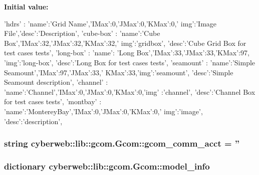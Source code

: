 {\bfseries \-Initial value\-:}
\begin{DoxyCode}
{
          'hdrs'         : {  'name':'Grid Name','IMax':0,'JMax':0,'KMax':0,'
      img':'Image File','desc':'Description'},
          'cube-box'     : {  'name':'Cube Box','IMax':32,'JMax':32,'KMax':32,'
      img':'gridbox',
                              'desc':'Cube Grid Box for test cases tests'},
          'long-box'     : {  'name': 'Long Box','IMax':33,'JMax':33,'KMax':97,
      'img':'long-box',
                              'desc':'Long Box for test cases tests'},
          'seamount'     : {  'name':'Simple Seamount','IMax':97,'JMax':33,'
      KMax':33,'img':'seamount',
                              'desc':'Simple Seamount description'},
          'channel'      : {  'name':'Channel','IMax':0,'JMax':0,'KMax':0,'img'
      :'channel',
                              'desc':'Channel Box for test cases tests'},
          'montbay'      : {  'name':'MontereyBay','IMax':0,'JMax':0,'KMax':0,'
      img':'image',
                              'desc':'description'},
          }
\end{DoxyCode}
\hypertarget{classcyberweb_1_1lib_1_1gcom_1_1_gcom_a6251cadcc78301410cf3856f8187cd89}{
\subsubsection[{gcom\-\_\-comm\-\_\-acct}]{\setlength{\rightskip}{0pt plus 5cm}string {\bf cyberweb\-::lib\-::gcom.\-Gcom\-::gcom\-\_\-comm\-\_\-acct} = ''}}\label{classcyberweb_1_1lib_1_1gcom_1_1_gcom_a6251cadcc78301410cf3856f8187cd89}
\hypertarget{classcyberweb_1_1lib_1_1gcom_1_1_gcom_a330ebc7950eec1558d9b88203c72211b}{
\subsubsection[{model\-\_\-info}]{\setlength{\rightskip}{0pt plus 5cm}dictionary {\bf cyberweb\-::lib\-::gcom.\-Gcom\-::model\-\_\-info}}}\label{classcyberweb_1_1lib_1_1gcom_1_1_gcom_a330ebc7950eec1558d9b88203c72211b}
